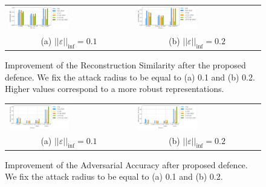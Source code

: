 \begin{figure}[ht]
    \centering
    \begin{tabular}{ll}
        \includegraphics[width=0.5\textwidth]{pics/3_adv_att/msssim_eps_1.pdf} & 
        \includegraphics[width=0.5\textwidth]{pics/3_adv_att/msssim_eps_2.pdf} \\
        \multicolumn{1}{c}{(a) $||\varepsilon ||_{\inf} = 0.1$} &
        \multicolumn{1}{c}{(b) $||\varepsilon ||_{\inf} = 0.2$} \\
    \end{tabular}
    \caption{Improvement of the Reconstruction Similarity after the proposed defence. We fix the attack radius to be equal to (a) 0.1 and (b) 0.2. Higher values correspond to a more robust representations.}
    \label{fig:mnist_rec_similarity}
    \vspace*{2\baselineskip}
\end{figure}

\begin{figure}[ht]
    \centering
    \begin{tabular}{ll}
        \includegraphics[width=0.5\textwidth]{pics/3_adv_att/adv_acc_eps_1.pdf} &
        \includegraphics[width=0.5\textwidth]{pics/3_adv_att/adv_acc_eps_2.pdf} \\
        \multicolumn{1}{c}{(a) $||\varepsilon ||_{\inf} = 0.1$} &
        \multicolumn{1}{c}{(b) $||\varepsilon ||_{\inf} = 0.2$} \\
    \end{tabular}
    \caption{Improvement of the Adversarial Accuracy after proposed defence. We fix the attack radius to be equal to (a) 0.1 and (b) 0.2.}
    \label{fig:mnist_adv_acc}
    \vspace*{\baselineskip}
\end{figure}



